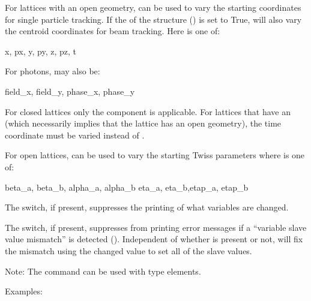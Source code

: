For lattices with an open geometry,  can be used to
vary the starting coordinates for single particle tracking. If the
 of the  structure () is set to
True,  will also vary the centroid coordinates for beam tracking. Here
 is one of:
\begin{example}
  x, px, y, py, z, pz, t
\end{example}
For photons,  may also be:
\begin{example}
  field_x, field_y, phase_x, phase_y
\end{example}
For closed lattices only the  component is applicable. For lattices that have an
 (which necessarily implies that the lattice has an open geometry), the time
 coordinate must be varied instead of .

For open lattices,  can be used to vary the starting
Twiss parameters where  is one of:
\begin{example}
  beta_a, beta_b, alpha_a, alpha_b 
  eta_a, eta_b,etap_a, etap_b    
\end{example}

The  switch, if present, suppresses the printing of what variables are
changed.

The  switch, if present, suppresses \tao from printing error messages if a ``variable
slave value mismatch'' is detected (). Independent of whether  is
present or not, \tao will fix the mismatch using the changed value to set all of the slave values.

Note: The  command can be used with  type elements.

Examples:


